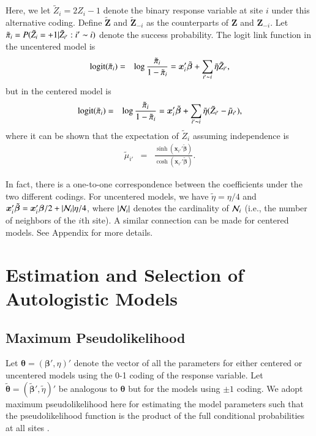 \documentclass[authoryear,review, 12pt]{elsarticle}
\begin{document}
Here, we let $\tilde{Z}_i=2Z_i-1$ denote the binary response variable at site $i$ under this alternative coding.  Define $\tilde{\bm{Z}}$ and $\tilde{\bm{Z}}_{-i}$ as the counterparts of $\bm{Z}$ and $\bm{Z}_{-i}$.  Let $\tilde{\pi}_i=P(\tilde{Z}_i=+1|\tilde{Z}_{i'}:i'\thicksim i)$ denote the success probability.  The logit link function in the uncentered model is
\begin{eqnarray}
\mbox{logit}(\tilde{\pi}_i)&=&\log\frac{\tilde{\pi}_i}{1-\tilde{\pi}_i}=\bm{x}'_i\tilde{\bm{\beta}}+\sum_{i'\thicksim i}\tilde{\eta}\tilde{Z}_{i'},
\label{eqn:logitPM}
\end{eqnarray}
but in the centered model is
\begin{eqnarray}
\mbox{logit}(\tilde{\pi}_i)&=&\log\frac{\tilde{\pi}_i}{1-\tilde{\pi}_i}=\bm{x}'_i\tilde{\bm{\beta}}+\sum_{i'\thicksim i}\tilde{\eta}(\tilde{Z}_{i'}-\tilde{\mu}_{i'}),
\label{eqn:logitPMcenter}
\end{eqnarray}
where it can be shown that the expectation of $\tilde{Z}_i$ assuming independence is
\begin{eqnarray}
\tilde{\mu}_{i'}&=&\frac{\sinh(\bm{x}_{i'}'\tilde{\bm{\beta}})}{\cosh(\bm{x}_{i'}'\tilde{\bm{\beta}})}.
\end{eqnarray}     

In fact, there is a one-to-one correspondence between the coefficients under the two different codings.  For uncentered models, we have $\tilde{\eta}=\eta/4$ and $\bm{x}_i'\tilde{\bm{\beta}}=\bm{x}_i'\bm{\beta}/2+|{\cal N}_i|\eta/4$, where $|{\cal N}_i|$ denotes the cardinality of ${\cal N}_i$ (i.e., the number of neighbors of the $i$th site). A similar connection can be made for centered models. See Appendix for more details. 

%
%
\section{Estimation and Selection of Autologistic Models}
\label{sec:infer}

\subsection{Maximum Pseudolikelihood}
\label{subsec:infer:pseudo}

Let $\bm{\theta}=(\bm{\beta}',\eta)'$ denote the vector of all the parameters for either centered or uncentered models using the 0-1 coding of the response variable.  Let $\tilde{\bm{\theta}}=(\tilde{\bm{\beta}}',\tilde{\eta})'$ be analogous to $\bm{\theta}$ but for the models using $\pm 1$ coding.  We adopt maximum pseudolikelihood here for estimating the model parameters such that the pseudolikelihood function is the product of the full conditional probabilities at all sites \citep{cressie93}.  
\end{document}

